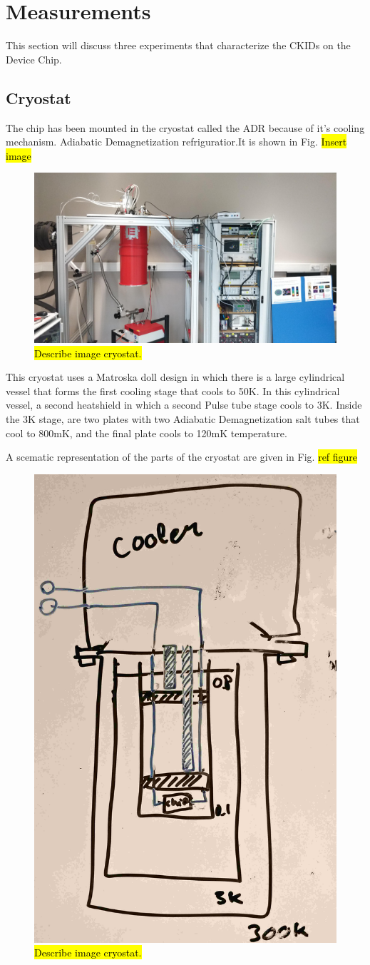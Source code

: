 \chapter{Measurements}
This section will discuss three experiments that characterize the CKIDs on the Device Chip. 

\section{Cryostat}
The chip has been mounted in the cryostat called the ADR because of it's cooling mechanism. Adiabatic Demagnetization refriguratior.It is shown in Fig. \hl{Insert image}

\begin{figure}[ht]
	\centering
	\includegraphics[width=.70\linewidth]{figures/ch5_measurement/ADR_OverviewV1.jpg}
	\caption{\hl{Describe image cryostat.}}
	\label{fig:ch6_ADR_image}
\end{figure}

This cryostat uses a Matroska doll design in which there is a large cylindrical vessel that forms the first cooling stage that cools to 50K. In this cylindrical vessel, a second heatshield in which a second Pulse tube stage cools to 3K. Inside the 3K stage, are two plates with two Adiabatic Demagnetization salt tubes that cool to 800mK, and the final plate cools to 120mK temperature.

A scematic representation of the parts of the cryostat are given in Fig. \hl{ref figure}

\begin{figure}[h!!!!!!!!!!]
	\centering
	\includegraphics[width=.40\linewidth]{figures/ch5_measurement/Cryostat_scematicV2.jpg}
	\caption{\hl{Describe image cryostat.}}
	\label{fig:ch6_cryostat_scematic}
\end{figure}

